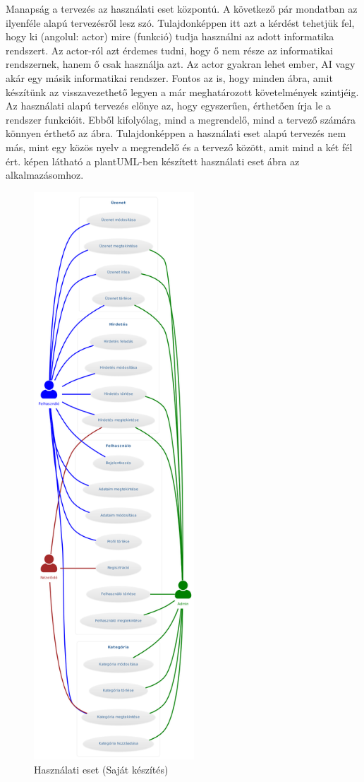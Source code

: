 \documentclass[]{thesis-ekf}
\theoremstyle{definition}
\theoremstyle{remark}
\begin{document}
	Manapság a tervezés az használati eset központú. A következő pár mondatban az ilyenféle alapú tervezésről lesz szó. Tulajdonképpen itt azt a kérdést tehetjük fel, hogy ki (angolul: actor) mire (funkció) tudja használni az adott informatika rendszert. Az actor-ról azt érdemes tudni, hogy ő nem része az informatikai rendszernek, hanem ő csak használja azt. Az actor gyakran lehet ember, AI vagy akár egy másik informatikai rendszer. Fontos az is, hogy minden ábra, amit készítünk az visszavezethető legyen a már meghatározott követelmények szintjéig. Az használati alapú tervezés előnye az, hogy egyszerűen, érthetően írja le a rendszer funkcióit. Ebből kifolyólag, mind a megrendelő, mind a tervező számára könnyen érthető az ábra. Tulajdonképpen a használati eset alapú tervezés nem más, mint egy közös nyelv a megrendelő és a tervező között, amit mind a két fél ért.\cite{Kusper Informatikai}  képen látható a plantUML-ben készített használati eset ábra az alkalmazásomhoz.
	\begin{figure}[ht!]
		\centering
		\includegraphics[width=6cm]{./tervezes/useCase}
		\caption{Használati eset (Saját készítés)} 
		\label{useCase}
	\end{figure}
\end{document}
